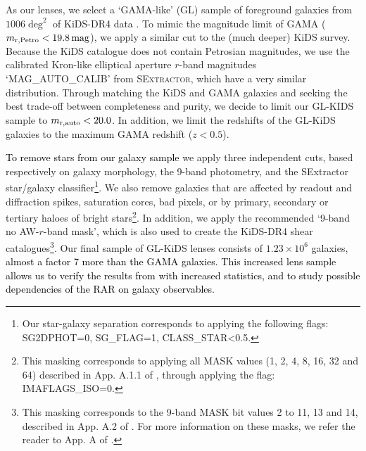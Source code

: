 \documentclass[usenatbib]{mnras}
\newcommand{\magn}{\, {\rm mag} }
\newcommand*{\E}[1]{\times 10^{#1}}
\newcommand{\un}[1]{_{\rm #1}}
\begin{document}
As our lenses, we select a `GAMA-like' (GL) sample of foreground galaxies from $1006 \deg^2$ of KiDS-DR4 data \cite[KiDS-1000,][]{kuijken2019}. To mimic the magnitude limit of GAMA ($m\un{r,Petro}<19.8 \magn$), we apply a similar cut to the (much deeper) KiDS survey. Because the KiDS catalogue does not contain Petrosian magnitudes, we use the calibrated Kron-like elliptical aperture $r$-band magnitudes `MAG\_AUTO\_CALIB' from \textsc{SExtractor}, which have a very similar distribution. Through matching the KiDS and GAMA galaxies and seeking the best trade-off between completeness and purity, we decide to limit our GL-KIDS sample to $m\un{r,auto}<20.0$. In addition, we limit the redshifts of the GL-KiDS galaxies to the maximum GAMA redshift ($z<0.5$).

\textcolor{black}{To remove stars from our galaxy sample} we apply three independent cuts, based respectively on galaxy morphology, the 9-band photometry, and the SExtractor star/galaxy classifier\footnote{Our star-galaxy separation corresponds to applying the following flags: SG2DPHOT=0, SG\_FLAG=1, CLASS\_STAR<0.5.}. We also remove galaxies that are affected by readout and diffraction spikes, saturation cores, bad pixels, or by primary, secondary or tertiary haloes of bright stars\footnote{This masking corresponds to applying all MASK values (1, 2, 4, 8, 16, 32 and 64) described in App. A.1.1 of \cite{kuijken2019}, through applying the flag: IMAFLAGS\_ISO=0.}. In addition, we apply the recommended `9-band no AW-$r$-band mask', which is also used to create the KiDS-DR4 shear catalogues\footnote{This masking corresponds to the 9-band MASK bit values 2 to 11, 13 and 14, described in App. A.2 of \cite{kuijken2019}. For more information on these masks, we refer the reader to App. A of \cite{kuijken2019}.}. Our final sample of GL-KiDS lenses consists of $1.23\E{6}$ galaxies, \textcolor{black}{almost a factor 7 more than the GAMA galaxies. This increased lens sample allows us to verify the results from \cite{brouwer2017} with increased statistics, and to study possible dependencies of the RAR on galaxy observables.}
\end{document}
